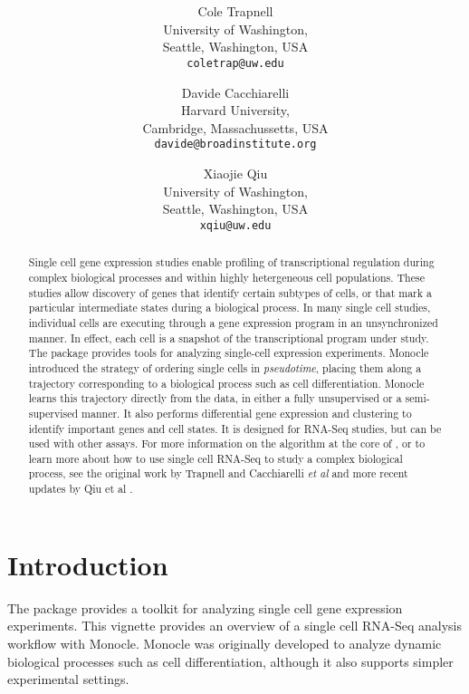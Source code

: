 \documentclass[10pt,oneside]{article}\usepackage[]{graphicx}\usepackage[]{color}
\title{\textsf{\textbf{\thetitle}}}
\author{Cole Trapnell\\[1em]University of Washington,\\ Seattle, Washington, USA\\
\texttt{coletrap@uw.edu} \and
Davide Cacchiarelli\\[1em]Harvard University,\\ Cambridge, Massachussetts, USA\\
\texttt{davide@broadinstitute.org}\and
Xiaojie Qiu\\[1em]University of Washington,\\ Seattle, Washington, USA\\
\texttt{xqiu@uw.edu}
}
\begin{document}
\maketitle

\begin{abstract}
Single cell gene expression studies enable profiling of transcriptional regulation during complex biological processes and within highly hetergeneous cell populations. These studies allow discovery of genes that identify certain subtypes of cells, or that mark a particular intermediate states during a biological process. In many single cell studies, individual cells are executing through a gene expression program in an unsynchronized manner. In effect, each cell is a snapshot of the transcriptional program under study. The package  provides tools for analyzing single-cell expression experiments. Monocle introduced the strategy of ordering single cells in \emph{pseudotime}, placing them along a trajectory corresponding to a biological process such as cell differentiation. Monocle learns this trajectory directly from the data, in either a fully unsupervised or a semi-supervised manner. It also performs differential gene expression and clustering to identify important genes and cell states. It is designed for RNA-Seq studies, but can be used with other assays. For more information on the algorithm at the core of , or to learn more about how to use single cell RNA-Seq to study a complex biological process, see the original work by Trapnell and Cacchiarelli \emph{et al}\cite{TRAPNELL_CACCHIARELLI} and more recent updates by Qiu et al \cite{qiu2017single, Qiu2017-nx}. 
\end{abstract}

\tableofcontents



\section{Introduction}

 The  package provides a toolkit for analyzing single cell gene expression experiments. This vignette provides an overview of a single cell RNA-Seq analysis workflow with Monocle. Monocle was originally developed to analyze dynamic biological processes such as cell differentiation, although it also supports simpler experimental settings. 
 
\end{document}
